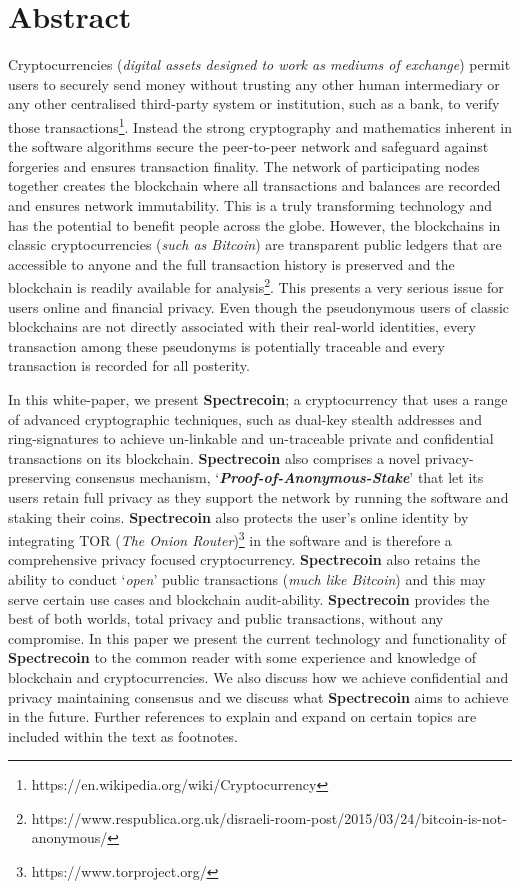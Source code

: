 \chapter{Abstract}
Cryptocurrencies (\textit{digital assets designed to work as mediums of exchange}) permit users to securely send money without trusting any other human intermediary or any other centralised third-party system or institution, such as a bank, to verify those transactions\footnote{https://en.wikipedia.org/wiki/Cryptocurrency }. Instead the strong cryptography and mathematics inherent in the software algorithms secure the peer-to-peer network and safeguard against forgeries and ensures transaction finality. The network of participating nodes together creates the blockchain where all transactions and balances are recorded and ensures network immutability. This is a truly transforming technology and has the potential to benefit people across the globe. However, the blockchains in classic cryptocurrencies (\textit{such as Bitcoin}) are transparent public ledgers that are accessible to anyone and the full transaction history is preserved and the blockchain is readily available for analysis\footnote{https://www.respublica.org.uk/disraeli-room-post/2015/03/24/bitcoin-is-not-anonymous/}. This presents a very serious issue for users online and financial privacy. Even though the pseudonymous users of classic blockchains are not directly associated with their real-world identities, every transaction among these pseudonyms is potentially traceable and every transaction is recorded for all posterity. 
 


In this white-paper, we present \textbf{Spectrecoin}; a cryptocurrency that uses a range of advanced cryptographic techniques, such as dual-key stealth addresses and ring-signatures to achieve un-linkable and un-traceable private and confidential transactions on its blockchain. \textbf{Spectrecoin} also comprises a novel privacy-preserving consensus mechanism, ‘\textbf{\textit{Proof-of-Anonymous-Stake}}’ that let its users retain full privacy as they support the network by running the software and staking their coins. \textbf{Spectrecoin} also protects the user’s online identity by integrating TOR (\textit{The Onion Router})\footnote{https://www.torproject.org/} in the software and is therefore a comprehensive privacy focused cryptocurrency. \textbf{Spectrecoin} also retains the ability to conduct ‘\textit{open}’ public transactions (\textit{much like Bitcoin}) and this may serve certain use cases and blockchain audit-ability. \textbf{Spectrecoin} provides the best of both worlds, total privacy and public transactions, without any compromise. In this paper we present the current technology and functionality of \textbf{Spectrecoin} to the common reader with some experience and knowledge of blockchain and cryptocurrencies. We also discuss how we achieve confidential and privacy maintaining consensus and we discuss what \textbf{Spectrecoin} aims to achieve in the future. Further references to explain and expand on certain topics are included within the text as footnotes. 